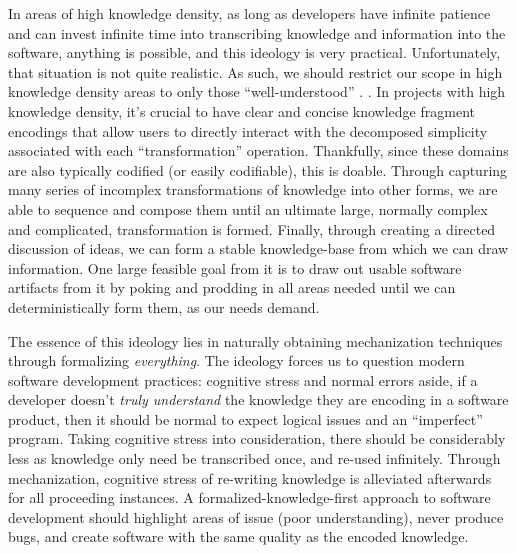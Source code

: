 

In areas of high knowledge density, as long as developers have infinite patience
and can invest infinite time into transcribing knowledge and information into
the software, anything is possible, and this ideology is very practical.
Unfortunately, that situation is not quite realistic. As such, we should
restrict our scope in high knowledge density areas to only those
``well-understood'' \cite{well-understood}. . In
projects with high knowledge density, it's crucial to have clear and concise
knowledge fragment encodings that allow users to directly interact with the
decomposed simplicity associated with each ``transformation'' operation.
Thankfully, since these domains are also typically codified (or easily
codifiable), this is doable. Through capturing many series of incomplex
transformations of knowledge into other forms, we are able to sequence and
compose them until an ultimate large, normally complex and complicated,
transformation is formed. Finally, through creating a directed discussion of
ideas, we can form a stable knowledge-base from which we can draw information.
One large feasible goal from it is to draw out usable software artifacts from it
by poking and prodding in all areas needed until we can deterministically form
them, as our needs demand.

The essence of this ideology lies in naturally obtaining mechanization
techniques through formalizing \textit{everything}. The ideology forces us to
question modern software development practices: cognitive stress and normal
errors aside, if a developer doesn't \textit{truly understand} the knowledge
they are encoding in a software product, then it should be normal to expect
logical issues and an ``imperfect'' program. Taking cognitive stress into
consideration, there should be considerably less as knowledge only need be
transcribed once, and re-used infinitely. Through mechanization, cognitive
stress of re-writing knowledge is alleviated afterwards for all proceeding
instances. A formalized-knowledge-first approach to software development should
highlight areas of issue (poor understanding), never produce bugs, and create
software with the same quality as the encoded knowledge.

